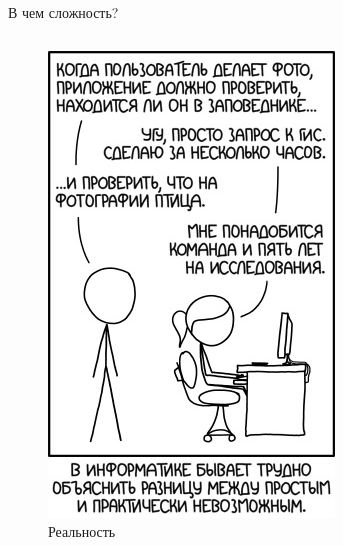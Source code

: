 \documentclass[aspectratio=169]{beamer}
\begin{document}
\begin{frame}{В чем сложность?}
\begin{columns}
\begin{column}{.24\linewidth}
\begin{figure}
                \includegraphics[width=\linewidth]{graphs/fig3_1.jpg}
                \caption*{Реальность}
            \end{figure}
        \end{column}
    \end{columns}
\end{frame}
\end{document}

